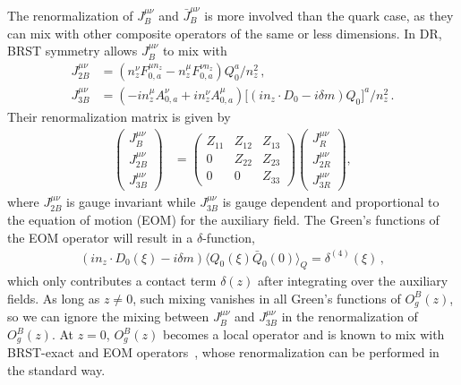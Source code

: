 \documentclass[aps,rmp,reprint,amsmath,amssymb,graphicx,longbibliography]{revtex4-1} %
\begin{document}
The renormalization of $J^{\mu\nu}_B$ and $\bar{J}^{\mu\nu}_B$ is more involved than the quark case, as they can mix with other composite operators of the same or less dimensions. In DR, BRST symmetry allows $J^{\mu\nu}_B$
to mix with~\cite{Dorn:1986dt,Zhang:2018diq}
\begin{align}
	J^{\mu\nu}_{2B} &\!=\! \left(n_z^\nu F^{\mu n_z}_{0,a} - n_z^\mu F^{\nu n_z}_{0,a} \right) Q_0^a/n_z^2\,,\\
	J^{\mu\nu}_{3B} &\!=\! (-in_z^\mu\! A^\nu_{0,a}\! +\! in_z^\nu A^\mu_{0,a})\big[(in_z\cdot\! D_0\!-\!i\delta m)Q_0\big]^a\!/n_z^2\,.
\end{align}
Their renormalization matrix is given by~\cite{Dorn:1986dt}
\begin{align}\label{eq:oprenormmix}
	\begin{pmatrix}
		J_{B}^{\mu\nu} \\  J_{2B}^{\mu\nu} \\ J_{3B}^{\mu\nu}
	\end{pmatrix}
	&=
	\begin{pmatrix}
		Z_{11} & Z_{12} & Z_{13}\\ 0 & Z_{22} & Z_{23} \\ 0 & 0 & Z_{33}
	\end{pmatrix}
	\begin{pmatrix}
		J_{R}^{\mu\nu}\\  J_{2R}^{\mu\nu} \\ J_{3R}^{\mu\nu}
	\end{pmatrix}
	,
\end{align}
where $J_{2B}^{\mu\nu}$ is gauge invariant while $J^{\mu\nu}_{3B}$ is gauge dependent and proportional to the equation of motion (EOM) for the auxiliary field. The Green's functions of the EOM operator will result in a $\delta$-function,
\begin{align}
	(in_z\cdot D_0(\xi)-i\delta m)\langle Q_0(\xi)\bar{Q}_0(0)\rangle_Q = \delta^{(4)}(\xi)\,,
\end{align}
which only contributes a contact term $\delta(z)$ after integrating over the auxiliary fields. As long as $z\neq0$, such mixing vanishes in all Green's functions of $O^B_g(z)$, so we can ignore the mixing between $J^{\mu\nu}_{B}$ and $J^{\mu\nu}_{3B}$ in the renormalization of $O^B_g(z)$. At $z=0$, $O^B_g(z)$ becomes a local operator and is known to mix with BRST-exact and EOM operators~\cite{Collins:1994ee}, whose renormalization can be performed in the standard way.
\end{document}
